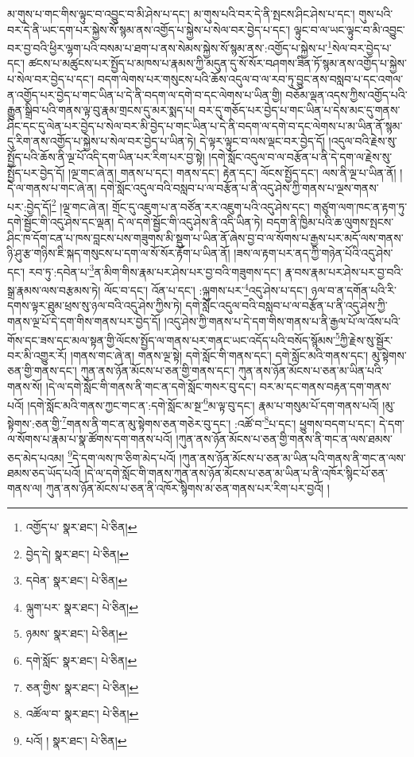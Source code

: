 མ་གུས་པ་གང་གིས་ལྟུང་བ་འབྱུང་བ་མི་ཤེས་པ་དང་། མ་གུས་པའི་བར་དེ་ནི་སྤངས་ཤིང་ཤེས་པ་དང་། གུས་པའི་བར་དེ་ནི་ཡང་དག་པར་སྐྱེས་སོ་སྙམ་ནས་འགྱོད་པ་སྐྱེས་པ་སེལ་བར་བྱེད་པ་དང་། ལྟུང་བ་ལ་ཡང་ལྟུང་བ་མི་འབྱུང་བར་བྱ་བའི་ཕྱིར་ལྷག་པའི་བསམ་པ་ཐག་པ་ནས་སེམས་སྐྱེས་སོ་སྙམ་ནས་:འགྱོད་པ་སྐྱེས་པ་\footnote{འགྱོད་པ་  སྣར་ཐང་།  པེ་ཅིན། }སེལ་བར་བྱེད་པ་དང་། ཚངས་པ་མཚུངས་པར་སྤྱོད་པ་མཁས་པ་རྣམས་ཀྱི་མདུན་དུ་སོ་སོར་བཤགས་ཟིན་ཏོ་སྙམ་ནས་འགྱོད་པ་སྐྱེས་པ་སེལ་བར་བྱེད་པ་དང་། བདག་ལེགས་པར་གསུངས་པའི་ཆོས་འདུལ་བ་ལ་རབ་ཏུ་བྱུང་ནས་བསླབ་པ་དང་འགལ་ན་འགྱོད་པར་བྱེད་པ་གང་ཡིན་པ་དེ་ནི་བདག་ལ་དགེ་བ་དང་ལེགས་པ་ཡིན་གྱི། བཅོམ་ལྡན་འདས་ཀྱིས་འགྱོད་པའི་རྒྱུན་སྒྲིབ་པའི་གནས་ལྟ་བུ་རྣམ་གྲངས་དུ་མར་སྨད་པ། བར་དུ་གཅོད་པར་བྱེད་པ་གང་ཡིན་པ་དེས་མང་དུ་གནས་ཤིང་དང་དུ་ལེན་པར་བྱེད་པ་སེལ་བར་མི་བྱེད་པ་གང་ཡིན་པ་དེ་ནི་བདག་ལ་དགེ་བ་དང་ལེགས་པ་མ་ཡིན་ནོ་སྙམ་དུ་རིག་ནས་འགྱོད་པ་སྐྱེས་པ་སེལ་བར་བྱེད་པ་ཡིན་ཏེ། དེ་ལྟར་ལྟུང་བ་ལས་ལྡང་བར་བྱེད་དོ། །འདུལ་བའི་རྗེས་སུ་སྤྱོད་པའི་ཆོས་ནི་ལྔ་པོ་འདི་དག་ཡིན་པར་རིག་པར་བྱ་སྟེ། །དགེ་སློང་འདུལ་བ་ལ་བརྩོན་པ་ནི་དེ་དག་ལ་རྗེས་སུ་སྤྱོད་པར་བྱེད་དོ། །ལྔ་གང་ཞེ་ན། གནས་པ་དང་། གནས་དང་། རྟེན་དང་། ལོངས་སྤྱོད་དང་། ལས་ནི་ལྔ་པ་ཡིན་ནོ། །དེ་ལ་གནས་པ་གང་ཞེ་ན། དགེ་སློང་འདུལ་བའི་བསླབ་པ་ལ་བརྩོན་པ་ནི་འདུ་ཤེས་ཀྱི་གནས་པ་ལྔས་གནས་པར་:བྱེད་དོ།\footnote{བྱེད་དེ།  སྣར་ཐང་།  པེ་ཅིན། } །ལྔ་གང་ཞེ་ན། གྲོང་དུ་འཇུག་པ་ན་བཙོན་རར་འཇུག་པའི་འདུ་ཤེས་དང་། གཙུག་ལག་ཁང་ན་རྟག་ཏུ་དགེ་སྦྱོང་གི་འདུ་ཤེས་དང་ལྡན། དེ་ལ་དགེ་སྦྱོང་གི་འདུ་ཤེས་ནི་འདི་ཡིན་ཏེ། བདག་ནི་ཁྱིམ་པའི་ཆ་ལུགས་སྤངས་ཤིང་ཁ་དོག་ངན་པ་ཁས་བླངས་པས་གཟུགས་མི་སྡུག་པ་ཡིན་ནོ་ཞེས་བྱ་བ་ལ་སོགས་པ་རྒྱས་པར་མདོ་ལས་གནས་ཉི་ཤུ་རྩ་གཉིས་ཇི་སྐད་གསུངས་པ་དག་ལ་སོ་སོར་རྟོག་པ་ཡིན་ནོ། །ཟས་ལ་རྟག་པར་ནད་ཀྱི་གཉེན་པོའི་འདུ་ཤེས་དང་། རབ་ཏུ་:དབེན་པ་\footnote{དབེན་  སྣར་ཐང་།  པེ་ཅིན། }ན་མིག་གིས་རྣམ་པར་ཤེས་པར་བྱ་བའི་གཟུགས་དང་། རྣ་བས་རྣམ་པར་ཤེས་པར་བྱ་བའི་སྒྲ་རྣམས་ལས་བརྩམས་ཏེ། ལོང་བ་དང་། འོན་པ་དང་། :ལྐུགས་པར་\footnote{ལྐུག་པར་  སྣར་ཐང་།  པེ་ཅིན། }འདུ་ཤེས་པ་དང་། ཉལ་བ་ན་དགོན་པའི་རི་དགས་ལྟར་ཐུམ་ཕྲས་སུ་ཉལ་བའི་འདུ་ཤེས་ཀྱིས་ཏེ། དགེ་སློང་འདུལ་བའི་བསླབ་པ་ལ་བརྩོན་པ་ནི་འདུ་ཤེས་ཀྱི་གནས་ལྔ་པོ་དེ་དག་གིས་གནས་པར་བྱེད་དོ། །འདུ་ཤེས་ཀྱི་གནས་པ་དེ་དག་གིས་གནས་པ་ནི་རྒྱལ་པོ་ལ་འོས་པའི་གོས་དང་ཟས་དང་མལ་སྟན་གྱི་ལོངས་སྤྱོད་ལ་གནས་པར་གནང་ཡང་འདོད་པའི་བསོད་སྙོམས་\footnote{ཉམས་  སྣར་ཐང་།  པེ་ཅིན། }ཀྱི་རྗེས་སུ་སྦྱོར་བར་མི་འགྱུར་རོ། །གནས་གང་ཞེ་ན། གནས་ལྔ་སྟེ། དགེ་སློང་གི་གནས་དང་། དགེ་སློང་མའི་གནས་དང་། མུ་སྟེགས་ཅན་གྱི་གནས་དང་། ཀུན་ནས་ཉོན་མོངས་པ་ཅན་གྱི་གནས་དང་། ཀུན་ནས་ཉོན་མོངས་པ་ཅན་མ་ཡིན་པའི་གནས་སོ། །དེ་ལ་དགེ་སློང་གི་གནས་ནི་གང་ན་དགེ་སློང་གསར་བུ་དང་། བར་མ་དང་གནས་བརྟན་དག་གནས་པའོ། །དགེ་སློང་མའི་གནས་ཀྱང་གང་ན་:དགེ་སློང་མ་སྔ་\footnote{དགེ་སློང་  སྣར་ཐང་།  པེ་ཅིན། }མ་ལྟ་བུ་དང་། རྣམ་པ་གསུམ་པོ་དག་གནས་པའོ། །མུ་སྟེགས་:ཅན་གྱི་\footnote{ཅན་གྱིས་  སྣར་ཐང་།  པེ་ཅིན། }གནས་ནི་གང་ན་མུ་སྟེགས་ཅན་གཅེར་བུ་དང་། :འཚོ་བ་\footnote{འཚོལ་བ་  སྣར་ཐང་།  པེ་ཅིན། }པ་དང་། ཕྱུགས་བདག་པ་དང་། དེ་དག་ལ་སོགས་པ་རྣམ་པ་སྣ་ཚོགས་དག་གནས་པའོ། །ཀུན་ནས་ཉོན་མོངས་པ་ཅན་གྱི་གནས་ནི་གང་ན་ལས་ཐམས་ཅད་མེད་པའམ། \footnote{པའོ། །   སྣར་ཐང་།  པེ་ཅིན། }དེ་དག་ལས་ཁ་ཅིག་མེད་པའོ། །ཀུན་ནས་ཉོན་མོངས་པ་ཅན་མ་ཡིན་པའི་གནས་ནི་གང་ན་ལས་ཐམས་ཅད་ཡོད་པའོ། །དེ་ལ་དགེ་སློང་གི་གནས་ཀུན་ནས་ཉོན་མོངས་པ་ཅན་མ་ཡིན་པ་ནི་འཁོར་སྙིང་པོ་ཅན་གནས་ལ། ཀུན་ནས་ཉོན་མོངས་པ་ཅན་ནི་འཁོར་སྙིགས་མ་ཅན་གནས་པར་རིག་པར་བྱའོ། །
